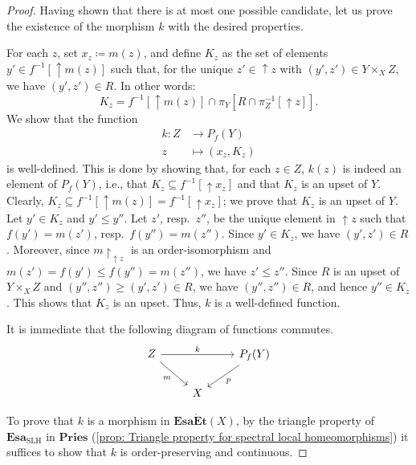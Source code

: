 \documentclass[12pt]{amsart}
\theoremstyle{plain}
\theoremstyle{definition}
\newcommand{\cat}[1]{\mathbf{#1}}
\newcommand{\Esa}{\cat{Esa}}
\newcommand{\Pries}{\cat{Pries}}
\newcommand{\SLH}{\mathrm{SLH}}
\newcommand{\EsaEt}{\cat{Esa\acute{E}t}}
\renewcommand{\u}{{\uparrow}}
\begin{document}
\begin{proof}
    Having shown that there is at most one possible candidate, let us prove the existence of the morphism $k$ with the desired properties.
 
    For each $z$, set $x_z \coloneqq m(z)$, and define $K_z$ as the set of elements $y' \in f^{-1}[\u m(z)]$ such that, for the unique $z' \in \u z$ with $(y',z') \in Y \times_X Z$, we have $(y',z') \in R$. In other words:
    \[
        K_{z} = f^{-1}[{\u}m(z)]\cap \pi_{Y}[R\cap \pi_{Z}^{-1}[{\u}z]].
    \]
    We show that the function
    \begin{align*}
        k \colon Z & \longrightarrow P_f(Y)\\
        z & \longmapsto (x_z, K_z)
    \end{align*}
    is well-defined.
    This is done by showing that, for each $z\in Z$, $k(z)$ is indeed an element of $P_f(Y)$, i.e., that $K_z \subseteq f^{-1}[\u x_z]$ and that $K_z$ is an upset of $Y$.
    Clearly, $K_z \subseteq f^{-1}[{\u}m(z)] = f^{-1}[\u x_z]$; we prove that $K_{z}$ is an upset of $Y$.
    Let $y' \in K_{z}$ and $y' \leq y''$.
    Let $z'$, resp.\ $z''$, be the unique element in $\u z$ such that $f(y') = m(z')$, resp.\ $f(y'') = m(z'')$.
    Since $y' \in K_z$, we have $(y', z') \in R$.
    Moreover, since $m{\restriction}_{\u z}$ is an order-isomorphism and $m(z') = f(y') \leq f(y'') = m(z'')$, we have $z' \leq z''$.
    Since $R$ is an upset of $Y \times_X Z$ and $(y'', z'') \geq (y', z') \in R$, we have $(y'', z'') \in R$, and hence $y'' \in K_z$.
    This shows that $K_z$ is an upset.
    Thus, $k$ is a well-defined function.
    
    It is immediate that the following diagram of functions commutes.
    \[
        \begin{tikzcd}
            Z \arrow[swap]{rd}{m}\arrow{rr}{k} & & P_f(Y)\arrow{ld}{p}\\
            & X
        \end{tikzcd}
    \]

    To prove that $k$ is a morphism in $\EsaEt(X)$, by the triangle property of $\Esa_{\SLH}$ in $\Pries$ (\cref{prop: Triangle property for spectral local homeomorphisms}) it suffices to show that $k$ is order-preserving and continuous.


\end{proof}
\end{document}
